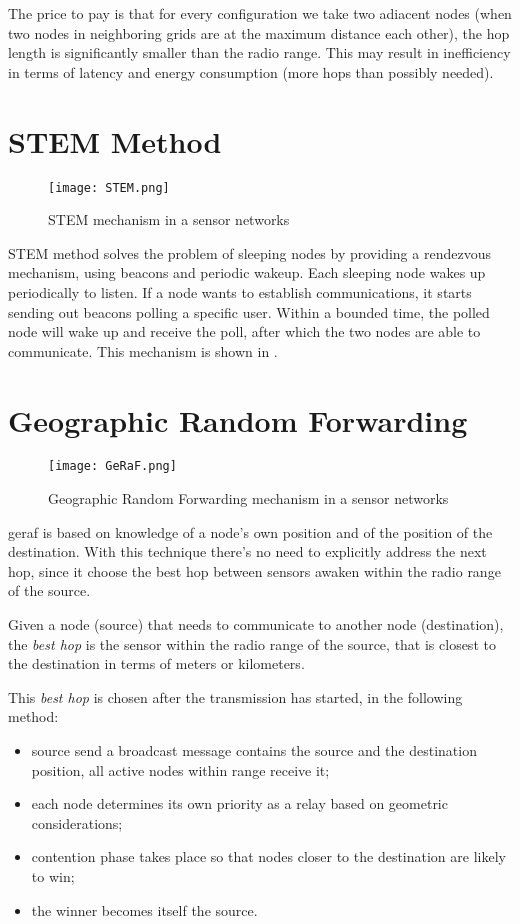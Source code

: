 The price to pay is that for every configuration we take two adiacent nodes (when two nodes in neighboring grids are at the maximum distance each other), the hop length is significantly smaller than the radio range. This may result in inefficiency in terms of latency and energy consumption (more hops than possibly needed).

\section{STEM Method}
\begin{figure}[h]
	\centering
	\texttt{[image: STEM.png]}
	\caption{STEM mechanism in a sensor networks}
	\label{fig:STEM}
\end{figure}
STEM method solves the problem of sleeping nodes by providing a rendezvous mechanism, using beacons and periodic wakeup.
Each sleeping node wakes up periodically to listen. If a node wants to establish communications, it starts sending out beacons polling a specific user. Within a bounded time, the polled node will wake up and receive the poll, after which the two nodes are able to communicate. This mechanism is shown in .

\section{Geographic Random Forwarding}
\begin{figure}[h]
	\centering
	\texttt{[image: GeRaF.png]}
	\caption{Geographic Random Forwarding mechanism in a sensor networks}
	\label{fig:GeRaF}
\end{figure}
\gls{geraf} is based on knowledge of a node’s own position and of the position of the destination.
With this technique there's no need to explicitly address the next hop, since it choose the best hop between sensors awaken within the radio range of the source.

Given a node (source) that needs to communicate to another node (destination), the \textit{best hop} is the sensor within the radio range of the source, that is closest to the destination in terms of meters or kilometers.

This \textit{best hop} is chosen after the transmission has started, in the following method:
\begin{itemize}
	\item source send a broadcast message contains the source and the destination position, all active nodes within range receive it;
	\item each node determines its own priority as a relay based on geometric considerations;
	\item contention phase takes place so that nodes closer to the destination are likely to win;
	\item the winner becomes itself the source.
\end{itemize}

